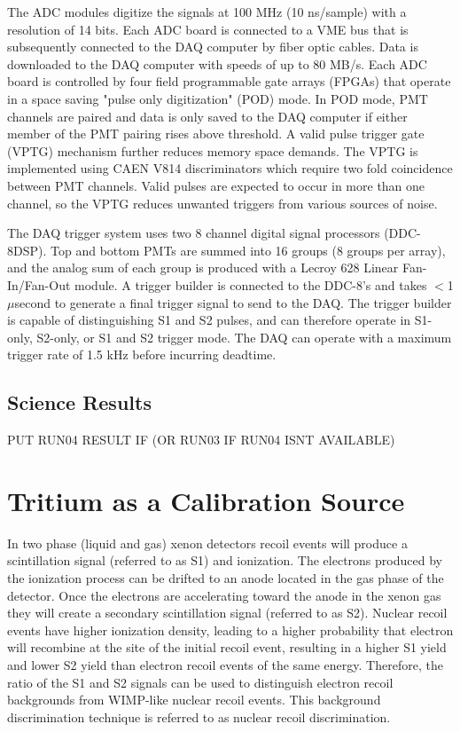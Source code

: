 \documentclass[a4paper,12pt]{article}
\begin{document}
The ADC modules digitize the signals at 100 MHz (10 ns/sample) with a resolution of 14 bits. Each ADC board is connected to a VME bus that is subsequently connected to the DAQ computer by fiber optic cables.  Data is downloaded to the DAQ computer with speeds of up to 80 MB/s.  Each ADC board is controlled by four field programmable gate arrays (FPGAs) that operate in a space saving "pulse only digitization" (POD) mode. In POD mode, PMT channels are paired and data is only saved to the DAQ computer if either member of the PMT pairing rises above threshold. A valid pulse trigger gate (VPTG) mechanism further reduces memory space demands.  The VPTG is implemented using CAEN V814 discriminators which require two fold coincidence between PMT channels. Valid pulses are expected to occur in more than one channel, so the VPTG reduces unwanted triggers from various sources of noise.

The DAQ trigger system uses two 8 channel digital signal processors (DDC-8DSP).  
Top and bottom PMTs are summed into 16 groups (8 groups per array), and the analog sum of each group is produced with a Lecroy 628 Linear Fan-In/Fan-Out module.  
A trigger builder is connected to the DDC-8’s and takes $<$1 $\mu$second to generate a final trigger signal to send to the DAQ.  The trigger builder is capable of distinguishing S1 and S2 pulses, and can therefore operate in S1-only, S2-only, or S1 and S2 trigger mode.  The DAQ can operate with a maximum trigger rate of 1.5 kHz before incurring deadtime. 

\subsection{Science Results}

PUT RUN04 RESULT IF (OR RUN03 IF RUN04 ISNT AVAILABLE)


\section{Tritium as a Calibration Source} \label{TritiumChapter}
 
In two phase (liquid and gas) xenon detectors recoil events will produce a scintillation signal (referred to as S1) and ionization. The electrons produced by the ionization process can be drifted to an anode located in the gas phase of the detector. Once the electrons are accelerating toward the anode in the xenon gas they will create a secondary scintillation signal (referred to as S2). Nuclear recoil events have higher ionization density, leading to a higher probability that electron will recombine at the site of the initial recoil event, resulting in a higher S1 yield and lower S2 yield than electron recoil events of the same energy. Therefore, the ratio of the S1 and S2 signals can be used to distinguish electron recoil backgrounds from WIMP-like nuclear recoil events.  This background discrimination technique is referred to as nuclear recoil discrimination.
\end{document}

